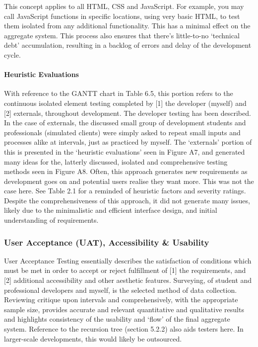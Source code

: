 \documentclass[11pt, english]{article}
\begin{document}
	This concept applies to all HTML, CSS and JavaScript. For example, you may call JavaScript functions in specific locations, using very basic HTML, to test them isolated from any additional functionality. This has a minimal effect on the aggregate system. This process also ensures that there's little-to-no `technical debt' accumulation, resulting in a backlog of errors and delay of the development cycle.\\

			\paragraph{Heuristic Evaluations}

	With reference to the GANTT chart in Table 6.5, this portion refers to the continuous isolated element testing completed by [1] the developer (myself) and [2] externals, throughout development. The developer testing has been described. In the case of externals, the discussed small group of development students and professionals (simulated clients) were simply asked to repeat small inputs and processes alike at intervals, just as practiced by myself. The `externals' portion of this is presented in the `heuristic evaluations' seen in Figure A7, and generated many ideas for the, latterly discussed, isolated and comprehensive testing methods seen in Figure A8. Often, this approach generates new requirements as development goes on and potential users realise they want more. This was not the case here. See Table 2.1 for a reminded of heuristic factors and severity ratings. Despite the comprehensiveness of this approach, it did not generate many issues, likely due to the minimalistic and efficient interface design, and initial understanding of requirements.

		\subsubsection{User Acceptance (UAT), Accessibility \& Usability}

	User Acceptance Testing essentially describes the satisfaction of conditions which must be met in order to accept or reject fulfillment of [1] the requirements, and [2] additional accessibility and other aesthetic features. Surveying, of student and professional developers and myself, is the selected method of data collection. Reviewing critique upon intervals and comprehensively, with the appropriate sample size, provides accurate and relevant quantitative and qualitative results and highlights consistency of the usability and `flow' of the final aggregate system. Reference to the recursion tree (section 5.2.2) also aids testers here. In larger-scale developments, this would likely be outsourced.\\
\end{document}
